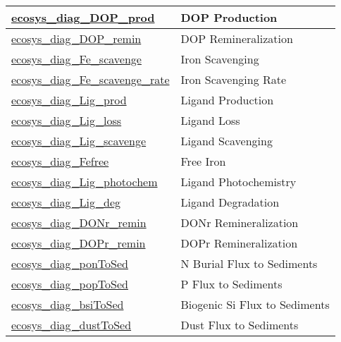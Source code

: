 {\begin{center}
\begin{longtable}{| p{2.0in} | p{4.0in} |}
    \hline
    \hyperref[subsec:var_sec_forcing_ecosys_diag_DOP_prod]{ecosys\_diag\_DOP\_prod} & DOP Production \\
    \hline
    \hyperref[subsec:var_sec_forcing_ecosys_diag_DOP_remin]{ecosys\_diag\_DOP\_remin} & DOP Remineralization \\
    \hline
    \hyperref[subsec:var_sec_forcing_ecosys_diag_Fe_scavenge]{ecosys\_diag\_Fe\_scavenge} & Iron Scavenging \\
    \hline
    \hyperref[subsec:var_sec_forcing_ecosys_diag_Fe_scavenge_rate]{ecosys\_diag\_Fe\_scavenge\_rate} & Iron Scavenging Rate \\
    \hline
    \hyperref[subsec:var_sec_forcing_ecosys_diag_Lig_prod]{ecosys\_diag\_Lig\_prod} & Ligand Production \\
    \hline
    \hyperref[subsec:var_sec_forcing_ecosys_diag_Lig_loss]{ecosys\_diag\_Lig\_loss} & Ligand Loss \\
    \hline
    \hyperref[subsec:var_sec_forcing_ecosys_diag_Lig_scavenge]{ecosys\_diag\_Lig\_scavenge} & Ligand Scavenging \\
    \hline
    \hyperref[subsec:var_sec_forcing_ecosys_diag_Fefree]{ecosys\_diag\_Fefree} & Free Iron \\
    \hline
    \hyperref[subsec:var_sec_forcing_ecosys_diag_Lig_photochem]{ecosys\_diag\_Lig\_photochem} & Ligand Photochemistry \\
    \hline
    \hyperref[subsec:var_sec_forcing_ecosys_diag_Lig_deg]{ecosys\_diag\_Lig\_deg} & Ligand Degradation \\
    \hline
    \hyperref[subsec:var_sec_forcing_ecosys_diag_DONr_remin]{ecosys\_diag\_DONr\_remin} & DONr Remineralization \\
    \hline
    \hyperref[subsec:var_sec_forcing_ecosys_diag_DOPr_remin]{ecosys\_diag\_DOPr\_remin} & DOPr Remineralization \\
    \hline
    \hyperref[subsec:var_sec_forcing_ecosys_diag_ponToSed]{ecosys\_diag\_ponToSed} & N Burial Flux to Sediments \\
    \hline
    \hyperref[subsec:var_sec_forcing_ecosys_diag_popToSed]{ecosys\_diag\_popToSed} & P Flux to Sediments \\
    \hline
    \hyperref[subsec:var_sec_forcing_ecosys_diag_bsiToSed]{ecosys\_diag\_bsiToSed} & Biogenic Si Flux to Sediments \\
    \hline
    \hyperref[subsec:var_sec_forcing_ecosys_diag_dustToSed]{ecosys\_diag\_dustToSed} & Dust Flux to Sediments \\
    \hline

\end{longtable}
\end{center}}
